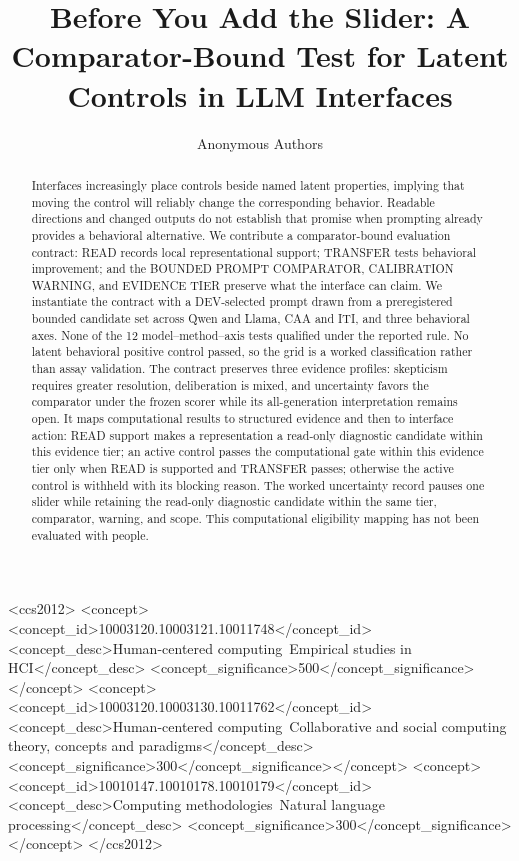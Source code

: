 \documentclass[manuscript,review,anonymous]{acmart}
\begin{document}
\title{Before You Add the Slider: A Comparator-Bound Test for Latent Controls in LLM Interfaces}
\renewcommand{\shorttitle}{Before You Add the Slider}

\author{Anonymous Authors}

\begin{abstract}
Interfaces increasingly place controls beside named latent properties, implying that moving the control will reliably change the corresponding behavior. Readable directions and changed outputs do not establish that promise when prompting already provides a behavioral alternative. We contribute a comparator-bound evaluation contract: READ records local representational support; TRANSFER tests behavioral improvement; and the BOUNDED PROMPT COMPARATOR, CALIBRATION WARNING, and EVIDENCE TIER preserve what the interface can claim. We instantiate the contract with a DEV-selected prompt drawn from a preregistered bounded candidate set across Qwen and Llama, CAA and ITI, and three behavioral axes. None of the 12 model--method--axis tests qualified under the reported rule. No latent behavioral positive control passed, so the grid is a worked classification rather than assay validation. The contract preserves three evidence profiles: skepticism requires greater resolution, deliberation is mixed, and uncertainty favors the comparator under the frozen scorer while its all-generation interpretation remains open. It maps computational results to structured evidence and then to interface action: READ support makes a representation a read-only diagnostic candidate within this evidence tier; an active control passes the computational gate within this evidence tier only when READ is supported and TRANSFER passes; otherwise the active control is withheld with its blocking reason. The worked uncertainty record pauses one slider while retaining the read-only diagnostic candidate within the same tier, comparator, warning, and scope. This computational eligibility mapping has not been evaluated with people.
\end{abstract}

\begin{CCSXML}
<ccs2012>
 <concept><concept_id>10003120.10003121.10011748</concept_id>
  <concept_desc>Human-centered computing~Empirical studies in HCI</concept_desc>
  <concept_significance>500</concept_significance></concept>
 <concept><concept_id>10003120.10003130.10011762</concept_id>
  <concept_desc>Human-centered computing~Collaborative and social computing theory, concepts and paradigms</concept_desc>
  <concept_significance>300</concept_significance></concept>
 <concept><concept_id>10010147.10010178.10010179</concept_id>
  <concept_desc>Computing methodologies~Natural language processing</concept_desc>
  <concept_significance>300</concept_significance></concept>
</ccs2012>
\end{CCSXML}
\end{document}
